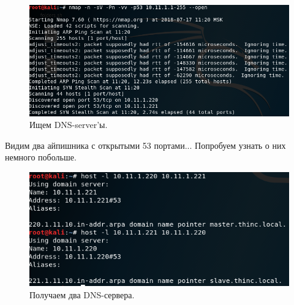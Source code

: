 \documentclass[a4paper,12pt]{article}
\begin{document}
\begin{figure}[h!]
	\includegraphics[width=\linewidth]{nmap_dns_search_6.png}
	\caption{Ищем DNS-server'ы.}
	\label{fig:boat2}
\end{figure}

Видим два айпишника с открытыми 53 портами... Попробуем узнать о них немного побольше.

\begin{figure}[h!]
	\includegraphics[width=\linewidth]{dns_master_slave_61.png}
	\caption{Получаем два DNS-сервера.}
	\label{fig:boat2}
\end{figure}
\end{document}
